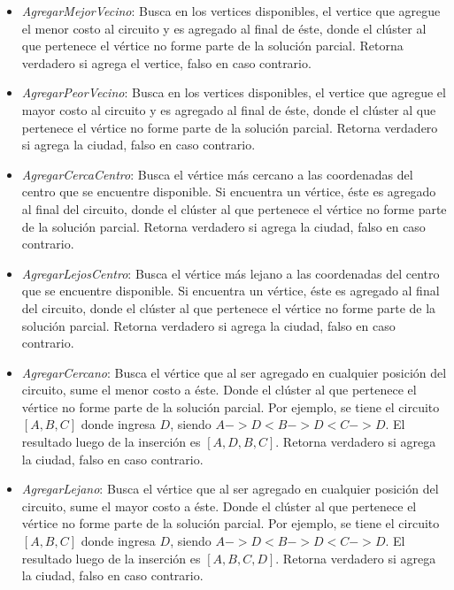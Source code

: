 \begin{itemize}

\item \textit{AgregarMejorVecino}: Busca en los vertices disponibles, el vertice que agregue el menor costo al circuito y es agregado al final de éste, donde el clúster al que pertenece el vértice no forme parte de la solución parcial. Retorna verdadero si agrega el vertice, falso en caso contrario.

\item \textit{AgregarPeorVecino}: Busca en los vertices disponibles, el vertice que agregue el mayor costo al circuito y es agregado al final de éste, donde el clúster al que pertenece el vértice no forme parte de la solución parcial. Retorna verdadero si agrega la ciudad, falso en caso contrario.

\item \textit{AgregarCercaCentro}: Busca el vértice más cercano a las coordenadas del centro que se encuentre disponible. Si encuentra un vértice, éste es agregado al final del circuito, donde el clúster al que pertenece el vértice no forme parte de la solución parcial. Retorna verdadero si agrega la ciudad, falso en caso contrario.

\item \textit{AgregarLejosCentro}:	Busca el vértice más lejano a las coordenadas del centro que se encuentre disponible. Si encuentra un vértice, éste es agregado al final del circuito, donde el clúster al que pertenece el vértice no forme parte de la solución parcial. Retorna verdadero si agrega la ciudad, falso en caso contrario.

\item \textit{AgregarCercano}: Busca el vértice que al ser agregado en cualquier posición del circuito, sume el menor costo a éste. Donde el clúster al que pertenece el vértice no forme parte de la solución parcial. Por ejemplo, se tiene el circuito $[A, B, C]$ donde ingresa $D$, siendo $A->D < B->D < C->D$. El resultado luego de la inserción es $[A, D, B, C]$. Retorna verdadero si agrega la ciudad, falso en caso contrario.

\item \textit{AgregarLejano}: Busca el vértice que al ser agregado en cualquier posición del circuito, sume el mayor costo a éste. Donde el clúster al que pertenece el vértice no forme parte de la solución parcial. Por ejemplo, se tiene el circuito $[A, B, C]$ donde ingresa $D$, siendo $A->D < B->D < C->D$. El resultado luego de la inserción es $[A, B, C, D]$. Retorna verdadero si agrega la ciudad, falso en caso contrario.


\end{itemize}
